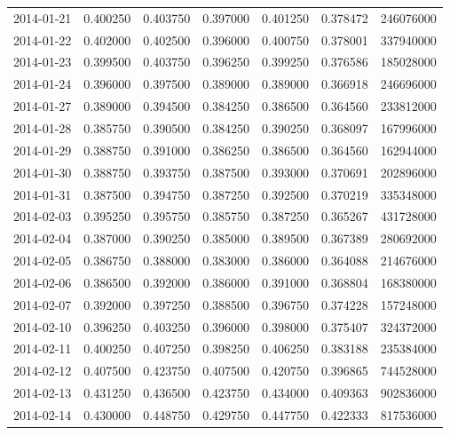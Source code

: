 \begin{tabular}{lrrrrrr}
2014-01-21 &    0.400250 &    0.403750 &    0.397000 &    0.401250 &    0.378472 &   246076000 \\
2014-01-22 &    0.402000 &    0.402500 &    0.396000 &    0.400750 &    0.378001 &   337940000 \\
2014-01-23 &    0.399500 &    0.403750 &    0.396250 &    0.399250 &    0.376586 &   185028000 \\
2014-01-24 &    0.396000 &    0.397500 &    0.389000 &    0.389000 &    0.366918 &   246696000 \\
2014-01-27 &    0.389000 &    0.394500 &    0.384250 &    0.386500 &    0.364560 &   233812000 \\
2014-01-28 &    0.385750 &    0.390500 &    0.384250 &    0.390250 &    0.368097 &   167996000 \\
2014-01-29 &    0.388750 &    0.391000 &    0.386250 &    0.386500 &    0.364560 &   162944000 \\
2014-01-30 &    0.388750 &    0.393750 &    0.387500 &    0.393000 &    0.370691 &   202896000 \\
2014-01-31 &    0.387500 &    0.394750 &    0.387250 &    0.392500 &    0.370219 &   335348000 \\
2014-02-03 &    0.395250 &    0.395750 &    0.385750 &    0.387250 &    0.365267 &   431728000 \\
2014-02-04 &    0.387000 &    0.390250 &    0.385000 &    0.389500 &    0.367389 &   280692000 \\
2014-02-05 &    0.386750 &    0.388000 &    0.383000 &    0.386000 &    0.364088 &   214676000 \\
2014-02-06 &    0.386500 &    0.392000 &    0.386000 &    0.391000 &    0.368804 &   168380000 \\
2014-02-07 &    0.392000 &    0.397250 &    0.388500 &    0.396750 &    0.374228 &   157248000 \\
2014-02-10 &    0.396250 &    0.403250 &    0.396000 &    0.398000 &    0.375407 &   324372000 \\
2014-02-11 &    0.400250 &    0.407250 &    0.398250 &    0.406250 &    0.383188 &   235384000 \\
2014-02-12 &    0.407500 &    0.423750 &    0.407500 &    0.420750 &    0.396865 &   744528000 \\
2014-02-13 &    0.431250 &    0.436500 &    0.423750 &    0.434000 &    0.409363 &   902836000 \\
2014-02-14 &    0.430000 &    0.448750 &    0.429750 &    0.447750 &    0.422333 &   817536000 \\

\end{tabular}
